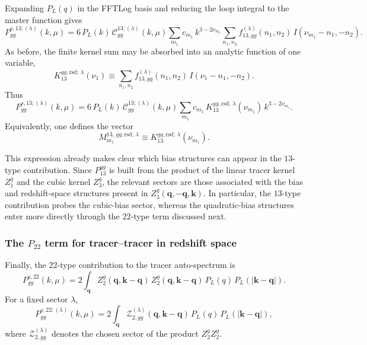 \documentclass[a4paper,11pt]{article}
\newcommand{\vk}{\bm{k}}
\newcommand{\vq}{\bm{q}}
\newcommand{\<}{\langle}
\renewcommand{\>}{\rangle}
\begin{document}
Expanding \(P_L(q)\) in the FFTLog basis and reducing the loop integral to the master function gives
\begin{equation}
P_{gg}^{s,13;(\lambda)}(k,\mu)
=
6\,P_L(k)\,\mathcal C_{gg}^{13;(\lambda)}(k,\mu)
\sum_{m_1} c_{m_1}\,
k^{3-2\nu_{m_1}}
\sum_{n_1,n_2}
f_{13,gg}^{(\lambda)}(n_1,n_2)\,
I(\nu_{m_1}-n_1,-n_2).
\label{eq:P13_gg_after_master}
\end{equation}
As before, the finite kernel sum may be absorbed into an analytic function of one variable,
\begin{equation}
K_{13}^{gg,\mathrm{rsd};\,\lambda}(\nu_1)
\equiv
\sum_{n_1,n_2}
f_{13,gg}^{(\lambda)}(n_1,n_2)\,
I(\nu_1-n_1,-n_2).
\label{eq:K13_gg_lambda}
\end{equation}
Thus
\begin{equation}
P_{gg}^{s,13;(\lambda)}(k,\mu)
=
6\,P_L(k)\,\mathcal C_{gg}^{13;(\lambda)}(k,\mu)
\sum_{m_1}
c_{m_1}\,
K_{13}^{gg,\mathrm{rsd};\,\lambda}(\nu_{m_1})\,
k^{3-2\nu_{m_1}}.
\label{eq:P13_gg_kernel_form}
\end{equation}
Equivalently, one defines the vector
\begin{equation}
M_{m_1}^{13,\,gg,\mathrm{rsd};\,\lambda}
\equiv
K_{13}^{gg,\mathrm{rsd};\,\lambda}(\nu_{m_1}).
\end{equation}

This expression already makes clear which bias structures can appear in the \(13\)-type contribution. Since \(P_{13}^{gg}\) is built from the product of the linear tracer kernel \(Z_1^g\) and the cubic kernel \(Z_3^g\), the relevant sectors are those associated with the bias and redshift-space structures present in \(Z_3^g(\vq,-\vq,\vk)\). In particular, the \(13\)-type contribution probes the cubic-bias sector, whereas the quadratic-bias structures enter more directly through the \(22\)-type term discussed next.

\subsubsection{The \(P_{22}\) term for tracer--tracer in redshift space}

Finally, the \(22\)-type contribution to the tracer auto-spectrum is
\begin{equation}
P_{gg}^{s,22}(k,\mu)
=
2\int_{\vq}
Z_2^g(\vq,\vk-\vq)\,
Z_2^g(\vq,\vk-\vq)\,
P_L(q)\,P_L(|\vk-\vq|).
\label{eq:P22_gg_start}
\end{equation}
For a fixed sector \(\lambda\),
\begin{equation}
P_{gg}^{s,22;(\lambda)}(k,\mu)
=
2\int_{\vq}
\mathcal Z_{2,gg}^{(\lambda)}(\vq,\vk-\vq)\,
P_L(q)\,P_L(|\vk-\vq|),
\label{eq:P22_gg_lambda_start}
\end{equation}
where \(\mathcal Z_{2,gg}^{(\lambda)}\) denotes the chosen sector of the product \(Z_2^g Z_2^g\).
\end{document}
